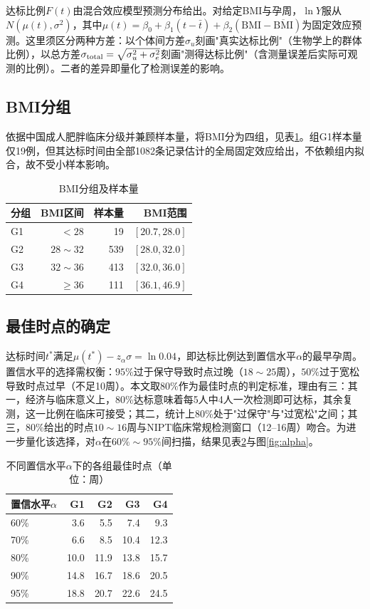 \documentclass[12pt]{ctexart}
\begin{document}
达标比例$F(t)$由混合效应模型预测分布给出。对给定BMI与孕周，$\ln Y$服从$N(\mu(t),\sigma^2)$，其中$\mu(t)=\beta_0+\beta_1(t-\bar t)+\beta_2(\mathrm{BMI}-\overline{\mathrm{BMI}})$为固定效应预测。这里须区分两种方差：以个体间方差$\sigma_u$刻画"真实达标比例"（生物学上的群体比例），以总方差$\sigma_{\rm total}=\sqrt{\sigma_u^2+\sigma_e^2}$刻画"测得达标比例"（含测量误差后实际可观测的比例）。二者的差异即量化了检测误差的影响。

\subsection{BMI分组}

依据中国成人肥胖临床分级并兼顾样本量，将BMI分为四组，见表\ref{tab:group}。组G1样本量仅19例，但其达标时间由全部1082条记录估计的全局固定效应给出，不依赖组内拟合，故不受小样本影响。

\begin{table}[H]
\centering
\caption{BMI分组及样本量}
\label{tab:group}
\begin{tabular}{lrrr}
\toprule
分组 & BMI区间 & 样本量 & BMI范围 \\
\midrule
G1 & $<28$ & 19 & $[20.7,28.0]$ \\
G2 & $28\sim32$ & 539 & $[28.0,32.0]$ \\
G3 & $32\sim36$ & 413 & $[32.0,36.0]$ \\
G4 & $\ge36$ & 111 & $[36.1,46.9]$ \\
\bottomrule
\end{tabular}
\end{table}

\subsection{最佳时点的确定}

达标时间$t^*$满足$\mu(t^*) - z_\alpha\sigma = \ln 0.04$，即达标比例达到置信水平$\alpha$的最早孕周。置信水平的选择需权衡：$95\%$过于保守导致时点过晚（$18\sim25$周），$50\%$过于宽松导致时点过早（不足10周）。本文取$80\%$作为最佳时点的判定标准，理由有三：其一，经济与临床意义上，80\%达标意味着每5人中4人一次检测即可达标，其余复测，这一比例在临床可接受；其二，统计上80\%处于"过保守"与"过宽松"之间；其三，80\%给出的时点$10\sim16$周与NIPT临床常规检测窗口（12--16周）吻合。为进一步量化该选择，对$\alpha$在$60\%\sim95\%$间扫描，结果见表\ref{tab:alpha}与图\ref{fig:alpha}。

\begin{table}[H]
\centering
\caption{不同置信水平$\alpha$下的各组最佳时点（单位：周）}
\label{tab:alpha}
\begin{tabular}{lrrrr}
\toprule
置信水平$\alpha$ & G1 & G2 & G3 & G4 \\
\midrule
60\% & 3.6 & 5.5 & 7.4 & 9.3 \\
70\% & 6.6 & 8.5 & 10.4 & 12.3 \\
80\% & 10.0 & 11.9 & 13.8 & 15.7 \\
90\% & 14.8 & 16.7 & 18.6 & 20.5 \\
95\% & 18.8 & 20.7 & 22.6 & 24.5 \\
\bottomrule
\end{tabular}
\end{table}
\end{document}
